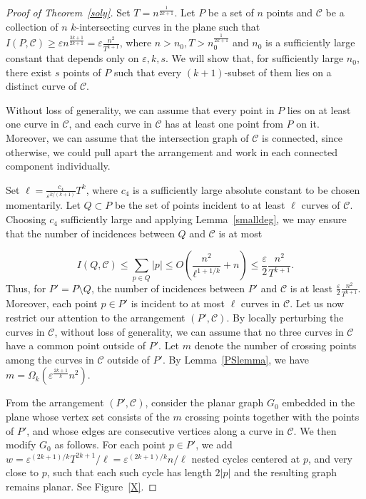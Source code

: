 \documentclass[11pt]{article}
\theoremstyle{plain}
\theoremstyle{definition}
\theoremstyle{remark}
\begin{document}
\begin{proof}[Proof of Theorem~\ref{soly}]
Set $T=n^{\frac{1}{2k+1}}$. Let $P$ be a set of $n$ points and $\mathcal{C}$ be a collection of $n$ $k$-intersecting curves in the plane such that $I(P,\mathcal{C}) \geq \varepsilon n^{\frac{3k + 1}{2k + 1}}=\varepsilon \frac{n^2}{T^{k+1}}$, where $n > n_0,T>n^{\frac{1}{2k+1}}_0$ and $n_0$ is a sufficiently large constant that depends only on $\varepsilon, k, s$. We will show that, for sufficiently large \(n_0\), there exist \(s\) points of \(P\) such that every \((k + 1)\)-subset of them lies on a distinct curve of \(\mathcal C\). 


Without loss of generality, we can assume that every point in $P$ lies on at least one curve in $\mathcal{C}$, and each curve in $\mathcal{C}$ has at least one point from $P$ on it.  
Moreover, we can assume that the intersection graph of $\mathcal{C}$ is connected, since otherwise, we could pull apart the arrangement and work in each connected component individually.  

Set \(\ell=\frac{c_4 }{\varepsilon^{k/(k+1)}}T^k\), where \(c_4\) is a sufficiently large absolute constant to be chosen momentarily. Let \(Q\subset P\) be the set of points incident to at least \(\ell\) curves of \(\mathcal C\). Choosing \(c_4\) sufficiently large and applying Lemma~\ref{smalldeg}, we may ensure that the number of incidences between \(Q\) and \(\mathcal C\) is at most

$$I(Q,\mathcal C) \leq \sum\limits_{p \in Q}|p| \leq O\left(\frac{n^2}{\ell^{1 + 1/k}} + n\right) \leq \frac{\varepsilon}{2} \frac{n^2}{T^{k+1}}.$$  Thus, for $P'   = P\setminus Q$, the number of incidences between $P'$ and $\mathcal C$ is at least $\frac{\varepsilon}{2} \frac{n^2}{T^{k+1}}$.  Moreover, each point $p \in P'$ is incident to at most $\ell$ curves in $\mathcal{C}$.  Let us now restrict our attention to the arrangement $(P', \mathcal C)$.  By locally perturbing the curves in $\mathcal C$, without loss of generality, we can assume that no three curves in $\mathcal{C}$ have a common point outside of $P'$.
Let $m$ denote the number of crossing points among the curves in $\mathcal{C}$ outside of $P'$.  
By Lemma~\ref{PSlemma}, we have $m=\Omega_k\!\left(\varepsilon^{\frac{2k+1}{k}}n^2\right)$.  

From the arrangement $(P',\mathcal{C})$, consider the planar graph $G_0$ embedded in the plane whose vertex set consists of the $m$ crossing points together with the points of $P'$, and whose edges are consecutive vertices along a curve in $\mathcal{C}$.  
We then modify $G_0$ as follows.  For each point $p \in P'$, we add $w = \varepsilon^{(2k + 1)/k}T^{2k+1}/\ell=\varepsilon^{(2k + 1)/k}n/\ell$ nested cycles centered at $p$, and very close to $p$, such that each such cycle has length $2|p|$ and the resulting graph remains planar.   See Figure~\ref{X}.  






\end{proof}
\end{document}
